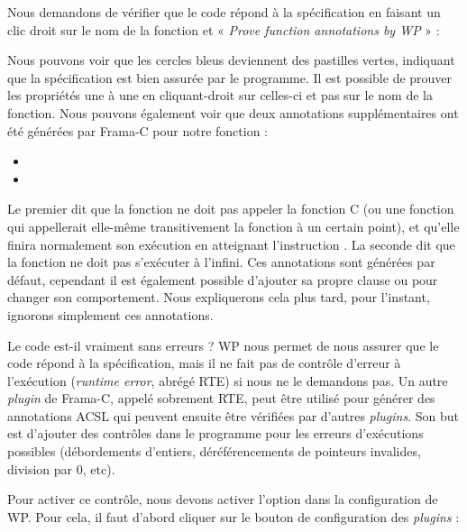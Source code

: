Nous demandons de vérifier que le code répond à la spécification en faisant
un clic droit sur le nom de la fonction et « \textit{Prove function annotations by WP} » :





Nous pouvons voir que les cercles bleus deviennent des pastilles vertes,
indiquant que la spécification est bien assurée par le programme. Il est
possible de prouver les propriétés une à une en cliquant-droit sur celles-ci
et pas sur le nom de la fonction. Nous pouvons également voir que deux
annotations supplémentaires ont été générées par Frama-C pour notre fonction :
\begin{itemize}
  \item {}
  \item {}
\end{itemize}
Le premier dit que la fonction ne doit pas appeler la fonction C
 (ou une fonction qui appellerait elle-même transitivement la
fonction  à un certain point), et qu'elle finira normalement
son exécution en atteignant l'instruction . La seconde dit
que la fonction ne doit pas s'exécuter à l'infini. Ces annotations sont générées
par défaut, cependant il est également possible d'ajouter sa propre clause
 ou  pour changer son comportement.
Nous expliquerons cela plus tard, pour l'instant, ignorons simplement ces
annotations.



Le code est-il vraiment sans erreurs ? WP nous permet de nous
assurer que le code répond à la spécification, mais il ne fait pas de contrôle
d'erreur à l'exécution (\textit{runtime error}, abrégé RTE) si nous ne le demandons
pas. Un autre \textit{plugin} de Frama-C, appelé sobrement RTE, peut être
utilisé pour générer des annotations ACSL qui peuvent ensuite être vérifiées par
d'autres \textit{plugins}.
Son but est
d'ajouter des contrôles dans le programme pour les erreurs d'exécutions
possibles (débordements d'entiers, déréférencements de pointeurs invalides,
division par 0, etc).



Pour activer ce contrôle, nous devons activer l'option dans la configuration
de WP. Pour cela, il faut d'abord cliquer sur le bouton de configuration des
\textit{plugins} :





